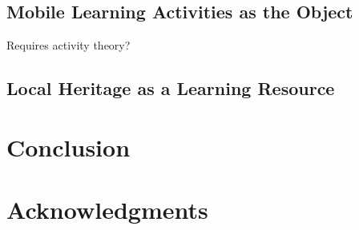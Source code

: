 \documentclass[,hyphens]{sigchi}
\begin{document}
\subsection{Mobile Learning Activities as the Object}
Requires activity theory?

\subsection{Local Heritage as a Learning Resource}

\section{Conclusion}

\section{Acknowledgments}

\balance{}



\end{document}
